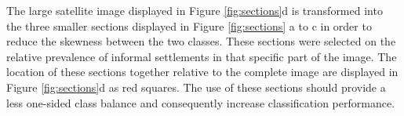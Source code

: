 The large satellite image displayed in Figure \ref{fig:sections}d is transformed into the three smaller sections displayed in Figure \ref{fig:sections} a to c in order to reduce the skewness between the two classes. These sections were selected on the relative prevalence of informal settlements in that specific part of the image. The location of these sections together relative to the complete image are displayed in Figure \ref{fig:sections}d as red squares. The use of these sections should provide a less one-sided class balance and consequently increase classification performance. 



